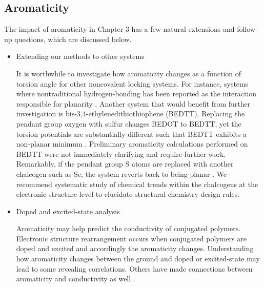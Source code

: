 \subsection{Aromaticity}

The impact of aromaticity in Chapter 3 has a few natural extensions and follow-up questions, which are discussed below.

\begin{itemize}
  \item Extending our methods to other systems

  It is worthwhile to investigate how aromaticity changes as a function of torsion angle for other noncovalent locking systems. For instance, systems where nontraditional hydrogen-bonding has been reported as the interaction responsible for planarity \cite{Jackson2013}. Another system that would benefit from further investigation is bis-3,4-ethylenedithiothiophene (BEDTT). Replacing the pendant group oxygen with sulfur changes BEDOT to BEDTT, yet the torsion potentials are substantially different such that BEDTT exhibits a non-planar minimum \cite{Conboy2016}. Preliminary aromaticity calculations performed on BEDTT were not immediately clarifying and require further work. Remarkably, if the pendant group S atoms are replaced with another chalcogen such as Se, the system reverts back to being planar \cite{Conboy2016}. We recommend systematic study of chemical trends within the chalcogens at the electronic structure level to elucidate structural-chemistry design rules.

  \item Doped and excited-state analysis

  Aromaticity may help predict the conductivity of conjugated polymers. Electronic structure rearrangement occurs when conjugated polymers are doped and excited and accordingly the aromaticity changes. Understanding how aromaticity changes between the ground and doped or excited-state may lead to some revealing correlations. Others have made connections between aromaticity and conductivity as well \cite{Chen2014}.

\end{itemize}
